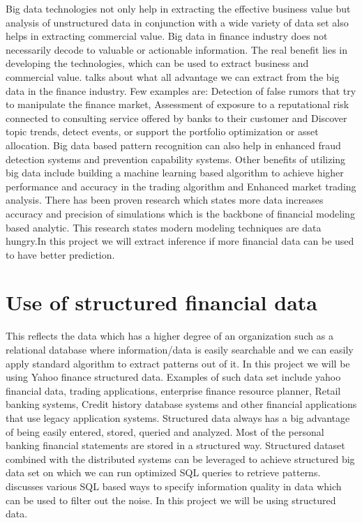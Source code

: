 \indent

Big data technologies not only help in extracting the effective business value but analysis of unstructured data in conjunction with a wide variety of data set 
also helps in extracting commercial value. Big data in finance industry does not necessarily decode to valuable or actionable information.
The real benefit lies in developing the technologies, which can be used to extract business and commercial value.  
\cite{Ref4}  talks about what all advantage we can extract from the big data in the finance industry. Few examples are: Detection of false rumors that try to
 manipulate the finance market, Assessment of exposure to a reputational risk connected to consulting service offered by banks to their customer and Discover 
 topic trends, detect events, or support the portfolio optimization or asset allocation.  Big data based pattern recognition can also help in enhanced fraud 
 detection systems and prevention capability systems. Other benefits of utilizing big data include building a machine learning based algorithm to achieve higher 
 performance and accuracy in the trading algorithm and Enhanced market trading analysis. There has been proven research \cite{Ref5} which states more data increases
 accuracy and precision of simulations which is the backbone of financial modeling based analytic. This research \cite{Ref5} states modern modeling techniques
 are data hungry.In this project we will extract inference if more financial data can be used to have better prediction.  


\section{Use of structured financial data}


This reflects the data which has a higher degree of an organization such as a relational database where information/data is easily searchable and we can easily 
apply standard algorithm to extract patterns out of it. In this project we will be using Yahoo finance structured data. Examples of such data set include
yahoo financial data, trading applications, enterprise finance resource planner, Retail banking 
systems, Credit history database systems and other financial applications that use legacy application systems. Structured data always has a big advantage of 
being easily entered, stored, queried and analyzed. Most of the personal banking financial statements are stored in a structured way.
 Structured dataset combined with the distributed systems can be leveraged to achieve structured big data set on which we can run optimized SQL queries to
 retrieve patterns. \cite{Ref6}  discusses various SQL based ways to specify information quality in data which can be used to filter out the noise. In this project 
 we will be using structured data. 

